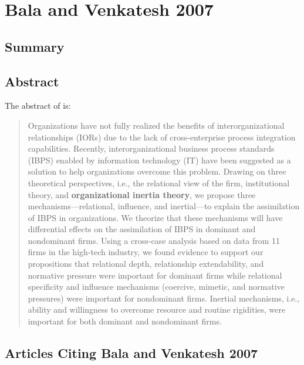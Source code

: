 \section{Bala and Venkatesh 2007}

\subsection{Summary}


\subsection{Abstract}

The abstract of \cite{bala2007assimilation} is:\\
\begin{quotation}
Organizations have not fully realized the benefits of interorganizational relationships (IORs) due to the lack of cross-enterprise process integration capabilities. Recently, interorganizational business process standards (IBPS) enabled by information technology (IT) have been suggested as a solution to help organizations overcome this problem. Drawing on three theoretical perspectives, i.e., the relational view of the firm, institutional theory, and \textbf{organizational inertia theory}, we propose three mechanisms—relational, influence, and inertial—to explain the assimilation of IBPS in organizations. We theorize that these mechanisms will have differential effects on the assimilation of IBPS in dominant and nondominant firms. Using a cross-case analysis based on data from 11 firms in the high-tech industry, we found evidence to support our propositions that relational depth, relationship extendability, and normative pressure were important for dominant firms while relational specificity and influence mechanisms (coercive, mimetic, and normative pressures) were important for nondominant firms. Inertial mechanisms, i.e., ability and willingness to overcome resource and routine rigidities, were important for both dominant and nondominant firms.
\end{quotation}

\subsection{Articles Citing Bala and Venkatesh 2007}

